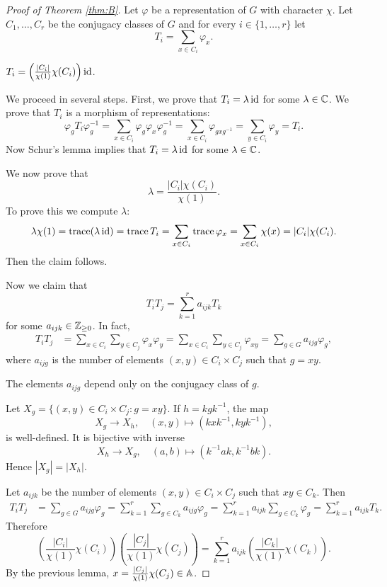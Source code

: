\begin{proof}[Proof of Theorem \ref{thm:B}]
    Let $\varphi$ be a representation of $G$ with character $\chi$. 
    Let $C_1,\dots,C_r$ be the conjugacy classes of $G$ 
    and for every $i\in\{1,\dots,r\}$ let 
    \[
    T_i=\sum_{x\in C_i}\varphi_x. 
    \]
    
    \begin{claim}
        $T_i=\left(\frac{|C_i|}{\chi(1)}\chi(C_i)\right)\operatorname{id}$. 
    \end{claim}
    
    We proceed in several steps. First, we prove that 
    $T_i=\lambda\operatorname{id}$ for some $\lambda\in\mathbb{C}$. 
    We prove that $T_i$ is a morphism of representations:
    \[
    \varphi_gT_i\varphi_g^{-1}=\sum_{x\in C_i}\varphi_g\varphi_x\varphi_g^{-1}
    =\sum_{x\in C_i}\varphi_{gxg^{-1}}=\sum_{y\in C_i}\varphi_y=T_i.
    \]
    Now Schur's lemma implies that $T_i=\lambda\operatorname{id}$ for some
    $\lambda\in\mathbb{C}$. 
    
    We now prove that 
    \[
    \lambda=\frac{|C_i|\chi(C_i)}{\chi(1)}.
    \]
    To prove
    this we compute $\lambda$:
    \[
    \lambda\chi(1)=\operatorname{trace}(\lambda\operatorname{id})
    =\operatorname{trace} T_i
    =\sum_{x\in C_i}\operatorname{trace}\varphi_x
    =\sum_{x\in C_i}\chi(x)
    =|C_i|\chi(C_i).
    \]
    Then the claim follows. 
    
    Now we claim that 
    \[
    T_iT_j=\sum_{k=1}^r a_{ijk}T_k
    \]
    for some $a_{ijk}\in\mathbb{Z}_{\geq0}$. In fact, 
    \begin{align*}
        T_iT_j &= \sum_{x\in C_i}\sum_{y\in C_j}\varphi_x\varphi_y
        =\sum_{x\in C_i}\sum_{y\in C_j}\varphi_{xy}
        =\sum_{g\in G}a_{ijg}\varphi_g,
    \end{align*}
    where $a_{ijg}$ is the number of elements $(x,y)\in C_i\times C_j$ 
    such that $g=xy$. 
    
    \begin{claim}
        The elements $a_{ijg}$ depend only on the conjugacy class of $g$. 
    \end{claim}
    
    Let $X_g=\{(x,y)\in C_i\times C_j:g=xy\}$. If $h=kgk^{-1}$, the map
    \[
    X_g\to X_h,\quad (x,y)\mapsto (kxk^{-1},kyk^{-1}),
    \]
    is well-defined. It is bijective with inverse
    \[
    X_h\to X_g,\quad
    (a,b)\mapsto (k^{-1}ak,k^{-1}bk).
    \]
    Hence $|X_g|=|X_h|$. 

    Let $a_{ijk}$ be the number of elements 
    $(x,y)\in C_i\times C_j$ such that $xy\in C_k$. 
    Then 
    \begin{align*}
        T_iT_j & 
        =\sum_{g\in G}a_{ijg}\varphi_g
        =\sum_{k=1}^r\sum_{g\in C_k}a_{ijg}\varphi_g
        =\sum_{k=1}^ra_{ijk}\sum_{g\in C_k}\varphi_g
        =\sum_{k=1}^ra_{ijk}T_k.
    \end{align*}
    Therefore 
    \begin{equation}
        \label{eq:omega}
    \left(\frac{|C_i|}{\chi(1)}\chi(C_i)\right)
    \left(\frac{|C_j|}{\chi(1)}\chi(C_j)\right)
    =\sum_{k=1}^r a_{ijk}\left(\frac{|C_k|}{\chi(1)}\chi(C_k)\right).
    \end{equation}
    By the previous lemma, $x=\frac{|C_j|}{\chi(1)}\chi(C_j)\in\mathbb{A}$.
\end{proof}


